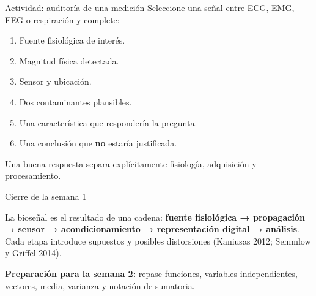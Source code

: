 \documentclass[
  ignorenonframetext,
  aspectratio=169,
  spanish,
  professionalfonts]{beamer}
\providecommand{\tightlist}{%
  \setlength{\itemsep}{0pt}\setlength{\parskip}{0pt}}
\begin{document}
\begin{frame}{Actividad: auditoría de una medición}
\protect{}\label{actividad-auditoruxeda-de-una-mediciuxf3n}
Seleccione una señal entre ECG, EMG, EEG o respiración y complete:

\begin{enumerate}
\tightlist
\item
  Fuente fisiológica de interés.
\item
  Magnitud física detectada.
\item
  Sensor y ubicación.
\item
  Dos contaminantes plausibles.
\item
  Una característica que respondería la pregunta.
\item
  Una conclusión que \textbf{no} estaría justificada.
\end{enumerate}

\begin{tcolorbox}[enhanced jigsaw, arc=.35mm, bottomrule=.15mm, bottomtitle=1mm, breakable, colback=white, colbacktitle=quarto-callout-tip-color!10!white, colframe=quarto-callout-tip-color-frame, coltitle=black, left=2mm, leftrule=.75mm, opacityback=0, opacitybacktitle=0.6, rightrule=.15mm, title={Criterio de calidad}, titlerule=0mm, toprule=.15mm, toptitle=1mm]

Una buena respuesta separa explícitamente fisiología, adquisición y
procesamiento.

\end{tcolorbox}
\end{frame}

\begin{frame}{Cierre de la semana 1}
\protect{}\label{cierre-de-la-semana-1}
\begin{tcolorbox}[enhanced jigsaw, arc=.35mm, bottomrule=.15mm, bottomtitle=1mm, breakable, colback=white, colbacktitle=quarto-callout-important-color!10!white, colframe=quarto-callout-important-color-frame, coltitle=black, left=2mm, leftrule=.75mm, opacityback=0, opacitybacktitle=0.6, rightrule=.15mm, title={Síntesis}, titlerule=0mm, toprule=.15mm, toptitle=1mm]

La bioseñal es el resultado de una cadena: \textbf{fuente fisiológica →
propagación → sensor → acondicionamiento → representación digital →
análisis}. Cada etapa introduce supuestos y posibles distorsiones
(Kaniusas 2012; Semmlow y Griffel 2014).

\end{tcolorbox}

\textbf{Preparación para la semana 2:} repase funciones, variables
independientes, vectores, media, varianza y notación de sumatoria.
\end{frame}
\end{document}
